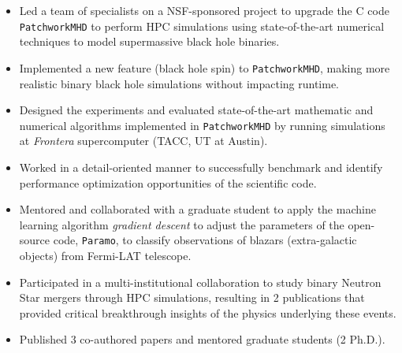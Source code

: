 {%
\begin{itemize}
    \item Led a team of specialists on a NSF-sponsored project to upgrade the C code \texttt{PatchworkMHD} to perform HPC simulations using state-of-the-art numerical techniques to model supermassive black hole binaries.
    \item Implemented a new feature (black hole spin) to \texttt{PatchworkMHD}, making more realistic binary black hole simulations without impacting runtime.
    \item Designed the experiments and evaluated state-of-the-art mathematic and numerical algorithms implemented in \texttt{PatchworkMHD} by running simulations at \emph{Frontera} supercomputer (TACC, UT at Austin).
    \item Worked in a detail-oriented manner to successfully benchmark and identify performance optimization opportunities of the scientific code.
    \item Mentored and collaborated with a graduate student to apply the machine learning algorithm \emph{gradient descent} to adjust the parameters of the open-source code, \texttt{Paramo}, to classify observations of blazars (extra-galactic objects) from Fermi-LAT telescope.
    \item Participated in a multi-institutional collaboration to study binary Neutron Star mergers through HPC simulations, resulting in 2 publications that provided critical breakthrough insights of the physics underlying these events.
    \item Published 3 co-authored papers and mentored graduate students (2 Ph.D.).
\end{itemize}
}

